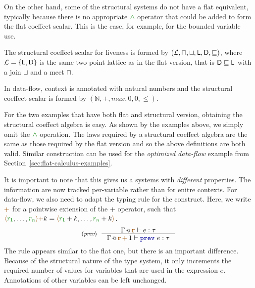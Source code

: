 On the other hand, some of the structural systems do not have a flat equivalent, typically 
because there is no appropriate $\czip$ operator that could be added to form the flat coeffect
scalar. This is the case, for example, for the bounded variable use.

\begin{example}
The structural coeffect scalar for liveness is formed by
$(\mathcal{L}, \sqcap, \sqcup, \textnormal{\sffamily L}, \textnormal{\sffamily D}, \sqsubseteq)$, where $\mathcal{L}=\{ \ident{L}, \ident{D} \}$ is 
the same two-point lattice as in the flat version, that is $\textnormal{\sffamily D} \sqsubseteq \textnormal{\sffamily L}$
with a join $\sqcup$ and a meet $\sqcap$. 
\end{example}

\begin{example}
In data-flow, context is annotated with natural numbers and the structural coeffect scalar is formed 
by $(\mathbb{N}, +, \mathit{max}, 0, 0, \leq)$.
\end{example}

\noindent
For the two examples that have both flat and structural version, obtaining the structural coeffect
algebra is easy. As shown by the examples above, we simply omit the $\czip$ operation. The laws
required by a structural coeffect algebra are the same as those required by the flat version
and so the above definitions are both valid. Similar construction can be used for the
\emph{optimized data-flow} example from Section~\ref{sec:flat-calculus-examples}.

It is important to note that this gives us a systems with \emph{different} properties. The 
information are now tracked per-variable rather than for enitre contexts. For data-flow,
we also need to adapt the typing rule for the  construct. Here, we write $\aclrd{+}$ 
for a pointwise extension of the $+$ operator, such that
$\alift{\cclrd{r_1}, \ldots, \cclrd{r_n}} \aclrd{+} k = \alift{\cclrd{r_1} + k, \ldots, \cclrd{r_n} + k}$.
%
\begin{equation*}
\tyrule{prev}
  { \coctx{\Gamma}{\aclrd{\textbf{r}}} \vdash e : \tau }
  { \coctx{\Gamma}{\aclrd{\textbf{r}} \,\aclrd{+}\, 1} \vdash \kvd{prev}~e : \tau }
\end{equation*}
%
The rule appears similar to the flat one, but there is an important difference. Because of the
structural nature of the type system, it only increments the required number of values for 
variables that are used in the expression $e$. Annotations of other variables can be left 
unchanged. 

